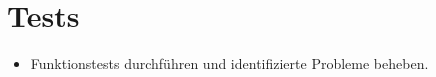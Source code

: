 \documentclass[../main.tex]{subfiles}
\begin{document}
\section{Tests}

\begin{itemize}
  \item Funktionstests durchführen und identifizierte Probleme beheben.
\end{itemize}
\end{document}
